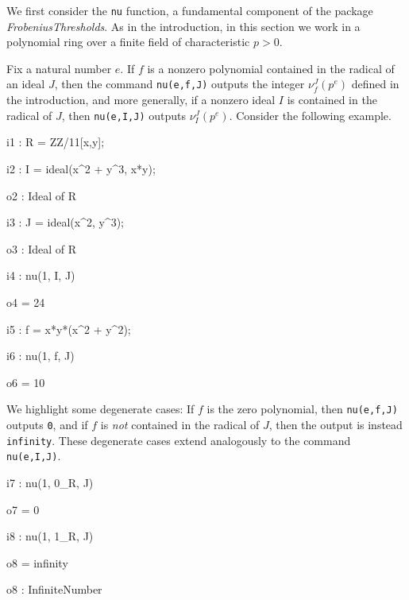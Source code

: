 \documentclass{amsart}
\begin{document}
We first consider the {\tt nu} function, a fundamental component of the package \emph{FrobeniusThresholds}.   As in the introduction, in this section we work in a polynomial ring over a finite field of characteristic $p>0$.

Fix a natural number $e$.  If $f$ is a nonzero polynomial contained in the radical of an ideal $J$, then the command {\tt nu(e,f,J)} outputs the integer $\nu_f^J(p^e)$ defined in the introduction, and 
more generally, if a nonzero ideal $I$ is contained in the radical of $J$, then {\tt nu(e,I,J)} outputs $\nu_I^J(p^e)$. Consider the following example.  %

{\small
{}
\begin{MyVerbatim}

i1 : R = ZZ/11[x,y];

i2 : I = ideal(x^2 + y^3, x*y);

o2 : Ideal of R

i3 : J = ideal(x^2, y^3);

o3 : Ideal of R

i4 : nu(1, I, J)

o4 = 24

i5 : f = x*y*(x^2 + y^2);

i6 : nu(1, f, J)

o6 = 10
\end{MyVerbatim}
}
\medspace


We highlight some degenerate cases:  If $f$ is the zero polynomial, then {\tt nu(e,f,J)} outputs {\tt 0}, and if $f$ is \emph{not} contained in the radical of $J$, then the output is instead {\tt infinity}.  These degenerate cases extend analogously to the command {\tt nu(e,I,J)}.

{\small
{}
\begin{MyVerbatim}

i7 : nu(1, 0_R, J)

o7 = 0

i8 : nu(1, 1_R, J)

o8 = infinity

o8 : InfiniteNumber
\end{MyVerbatim}
}
\medspace

\end{document}
